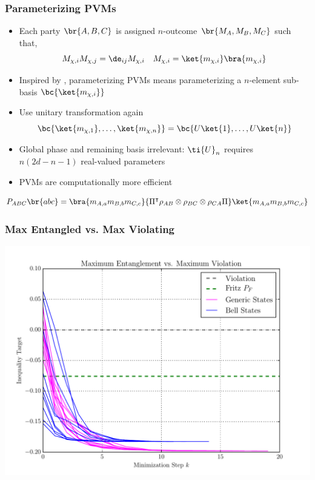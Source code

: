 \documentclass[
    hyperref={bookmarks=false},%
    xcolor={dvipsnames},
]{beamer}
\begin{document}
\begin{frame}
    \frametitle{Parameterizing PVMs}
    \begin{itemize}
        \item Each party $\br{A, B, C}$ is assigned $n$-outcome $\br{M_A, M_B, M_C}$ such that,
        \[ M_{\chi,i}M_{\chi,j} = \de_{ij} M_{\chi, i} \quad M_{\chi, i} = \ket{m_{\chi,i}}\bra{m_{\chi,i}} \]
        \item Inspired by \cite{Pal_2010}, parameterizing PVMs means parameterizing a $n$-element sub-basis $\bc{\ket{m_{\chi,i}}}$
        \item Use unitary transformation again
        \[ \bc{\ket{m_{\chi,1}}, \ldots, \ket{m_{\chi,n}}} = \bc{U \ket{1}, \ldots, U \ket{n}} \]
        \item Global phase and remaining basis irrelevant: $\ti{U}_{n}$ requires $n(2d - n - 1)$ real-valued parameters\
        \item PVMs are computationally more efficient
    \end{itemize}
    \[ \prob[ABC]\br{abc} = \bra{m_{A,a}m_{B,b}m_{C,c}}{\netperm^\intercal \rho_{AB}\otimes\rho_{BC}\otimes\rho_{CA} \netperm}\ket{m_{A,a}m_{B,b}m_{C,c}} \]
\end{frame}
\begin{frame}
    \frametitle{Max Entangled vs. Max Violating} %
    \includegraphics[width=\linewidth]{../../figures/optimizations/Max_Entanglement_vs_Max_Violation_fritz_seed.pdf}
\end{frame}
\end{document}
